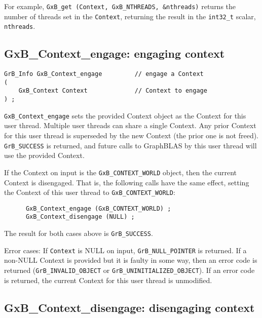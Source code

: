 \documentclass[12pt]{article}
\begin{document}
For example, \verb'GxB_get (Context, GxB_NTHREADS, &nthreads)' returns the
number of threads set in the \verb'Context', returning the result in the
\verb'int32_t' scalar, \verb'nthreads'.

\newpage
\subsection{{\sf GxB\_Context\_engage:}  engaging context}
\label{context_engage}

\begin{mdframed}[userdefinedwidth=6in]
{\footnotesize
\begin{verbatim}
GrB_Info GxB_Context_engage         // engage a Context
(
    GxB_Context Context             // Context to engage
) ;
\end{verbatim} } \end{mdframed}

\verb'GxB_Context_engage' sets the provided Context object as the Context for
this user thread.  Multiple user threads can share a single Context.  Any prior
Context for this user thread is superseded by the new Context (the prior one is
not freed).  \verb'GrB_SUCCESS' is returned, and future calls to GraphBLAS by
this user thread will use the provided Context.

If the Context on input is the \verb'GxB_CONTEXT_WORLD' object, then the
current Context is disengaged.  That is, the following calls have the same
effect, setting the Context of this user thread to \verb'GxB_CONTEXT_WORLD':

{\footnotesize
\begin{verbatim}
      GxB_Context_engage (GxB_CONTEXT_WORLD) ;
      GxB_Context_disengage (NULL) ;
\end{verbatim} }

The result for both cases above is \verb'GrB_SUCCESS'.

Error cases: If \verb'Context' is NULL on input, \verb'GrB_NULL_POINTER' is
returned.  If a non-NULL Context is provided but it is faulty in some way, then
an error code is returned (\verb'GrB_INVALID_OBJECT' or
\verb'GrB_UNINITIALIZED_OBJECT').  If an error code is returned, the current
Context for this user thread is unmodified.

\subsection{{\sf GxB\_Context\_disengage:}  disengaging context}
\label{context_disengage}
\end{document}
